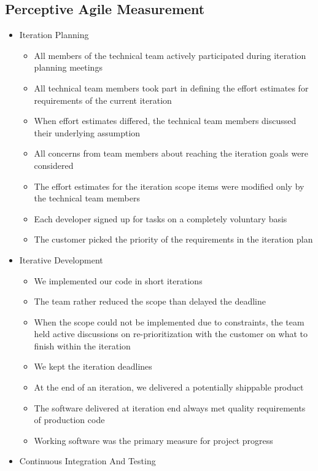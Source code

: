 \begin{appendices}
\chapter{Perceptive Agile Measurement}  %
\label{sec:pam}

\begin{itemize}
	\item Iteration Planning
		\begin{itemize}
			\item All members of the technical team actively participated during iteration planning meetings
			\item All technical team members took part in defining the effort estimates for requirements of the current iteration
   			\item When effort estimates differed, the technical team members discussed their underlying assumption
   			\item All concerns from team members about reaching the iteration goals were considered
   			\item The effort estimates for the iteration scope items were modified only by the technical team members
   			\item Each developer signed up for tasks on a completely voluntary basis
   			\item The customer picked the priority of the requirements in the iteration plan
		\end{itemize}
	\item Iterative Development
		\begin{itemize}
			\item We implemented our code in short iterations
			\item The team rather reduced the scope than delayed the deadline
			\item When the scope could not be implemented due to constraints, the team held active discussions on re-prioritization with the customer on what to finish within the iteration
			\item We kept the iteration deadlines
			\item At the end of an iteration, we delivered a potentially shippable product
			\item The software delivered at iteration end always met quality requirements of production code
			\item Working software was the primary measure for project progress
		\end{itemize}
	\item Continuous Integration And Testing

\end{itemize}
\end{appendices}
